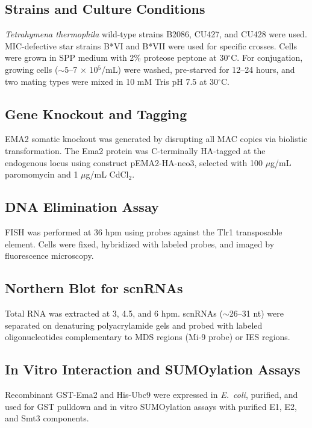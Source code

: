 \documentclass[11pt]{article}
\begin{document}
\subsection{Strains and Culture Conditions}

\textit{Tetrahymena thermophila} wild-type strains B2086, CU427, and CU428 were used. MIC-defective star strains B*VI and B*VII were used for specific crosses. Cells were grown in SPP medium with 2\% proteose peptone at 30$^\circ$C. For conjugation, growing cells ($\sim$5--7 $\times$ 10$^5$/mL) were washed, pre-starved for 12--24 hours, and two mating types were mixed in 10 mM Tris pH 7.5 at 30$^\circ$C.

\subsection{Gene Knockout and Tagging}

EMA2 somatic knockout was generated by disrupting all MAC copies via biolistic transformation. The Ema2 protein was C-terminally HA-tagged at the endogenous locus using construct pEMA2-HA-neo3, selected with 100 $\mu$g/mL paromomycin and 1 $\mu$g/mL CdCl$_2$.

\subsection{DNA Elimination Assay}

FISH was performed at 36 hpm using probes against the Tlr1 transposable element. Cells were fixed, hybridized with labeled probes, and imaged by fluorescence microscopy.

\subsection{Northern Blot for scnRNAs}

Total RNA was extracted at 3, 4.5, and 6 hpm. scnRNAs ($\sim$26--31 nt) were separated on denaturing polyacrylamide gels and probed with labeled oligonucleotides complementary to MDS regions (Mi-9 probe) or IES regions.

\subsection{In Vitro Interaction and SUMOylation Assays}

Recombinant GST-Ema2 and His-Ubc9 were expressed in \textit{E.~coli}, purified, and used for GST pulldown and in vitro SUMOylation assays with purified E1, E2, and Smt3 components.
\end{document}
